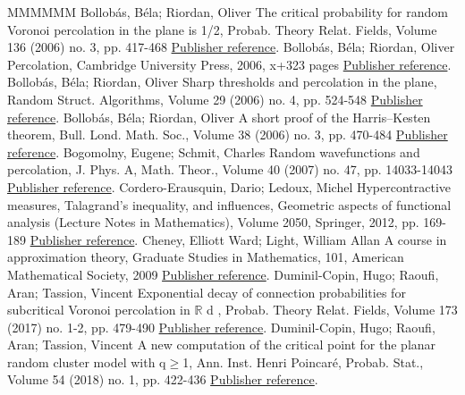 \documentclass[11pt]{article}
\theoremstyle{definition}
\numberwithin{equation}{section}
\begin{document}
\begin{thebibliography}{MMMMMM}
 Bollobás, Béla; Riordan, Oliver The critical probability for random Voronoi percolation in the plane is 1/2, Probab. Theory Relat. Fields, Volume 136 (2006) no. 3, pp. 417-468 \href{https://ahl.centre-mersenne.org/item/AHL_2020__3__169_0/#bollobas2006critical}{Publisher reference}.
 Bollobás, Béla; Riordan, Oliver Percolation, Cambridge University Press, 2006, x+323 pages \href{https://ahl.centre-mersenne.org/item/AHL_2020__3__169_0/#bollobas2006percolation}{Publisher reference}.
 Bollobás, Béla; Riordan, Oliver Sharp thresholds and percolation in the plane, Random Struct. Algorithms, Volume 29 (2006) no. 4, pp. 524-548 \href{https://ahl.centre-mersenne.org/item/AHL_2020__3__169_0/#bollobas2006sharp}{Publisher reference}.
 Bollobás, Béla; Riordan, Oliver A short proof of the Harris–Kesten theorem, Bull. Lond. Math. Soc., Volume 38 (2006) no. 3, pp. 470-484 \href{https://ahl.centre-mersenne.org/item/AHL_2020__3__169_0/#bollobas2006short}{Publisher reference}.
 Bogomolny, Eugene; Schmit, Charles Random wavefunctions and percolation, J. Phys. A, Math. Theor., Volume 40 (2007) no. 47, pp. 14033-14043 \href{https://ahl.centre-mersenne.org/item/AHL_2020__3__169_0/#bs_07}{Publisher reference}.
 Cordero-Erausquin, Dario; Ledoux, Michel Hypercontractive measures, Talagrand’s inequality, and influences, Geometric aspects of functional analysis (Lecture Notes in Mathematics), Volume 2050, Springer, 2012, pp. 169-189 \href{https://ahl.centre-mersenne.org/item/AHL_2020__3__169_0/#cordero2012hypercontractive}{Publisher reference}.
 Cheney, Elliott Ward; Light, William Allan A course in approximation theory, Graduate Studies in Mathematics, 101, American Mathematical Society, 2009 \href{https://ahl.centre-mersenne.org/item/AHL_2020__3__169_0/#cheney2009course}{Publisher reference}.
 Duminil-Copin, Hugo; Raoufi, Aran; Tassion, Vincent Exponential decay of connection probabilities for subcritical Voronoi percolation in \ensuremath{\mathbb{R}} d , Probab. Theory Relat. Fields, Volume 173 (2017) no. 1-2, pp. 479-490 \href{https://ahl.centre-mersenne.org/item/AHL_2020__3__169_0/#duminil2017exponential}{Publisher reference}.
 Duminil-Copin, Hugo; Raoufi, Aran; Tassion, Vincent A new computation of the critical point for the planar random cluster model with q\ensuremath{\geq}1, Ann. Inst. Henri Poincaré, Probab. Stat., Volume 54 (2018) no. 1, pp. 422-436 \href{https://ahl.centre-mersenne.org/item/AHL_2020__3__169_0/#duminil2016new}{Publisher reference}.

\end{thebibliography}
\end{document}
